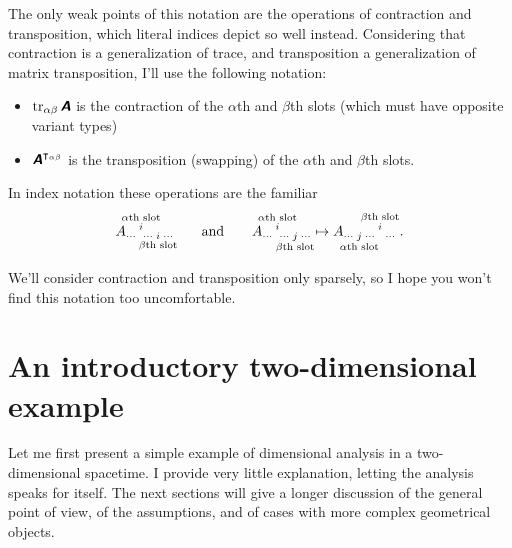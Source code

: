 \documentclass[\ifafour a4paper,12pt,\else a5paper,10pt,\fi%
onecolumn,oneside,article,%
british%
]{memoir}
\makeatletter
\theoremstyle{remark}
\theoremstyle{innote}
\newcommand*{\mathte}[1]{\textbf{\textit{\textsf{#1}}}}
\DeclareMathOperator{\tr}{tr}%
\renewcommand*{\|}[1][]{\nonscript\,#1\vert\nonscript\;\mathopen{}}
\newcommand*{\q}{}%
\DeclareRobustCommand*{\q}{%
  \mathbin{\mathpalette\bigcdot@{}}%
}
\newcommand*{\bigcdot@scalefactor}{0.75}
\newcommand*{\bigcdot@widthfactor}{1.5}
\newcommand*{\bigcdot@}[2]{%
  \sbox0{$#1\vcenter{}$}%
  \sbox2{$#1\cdot\m@th$}%
  \hbox to \bigcdot@widthfactor\wd2{%
    \hfil
    \raise\ht0\hbox{%
      \scalebox{\bigcdot@scalefactor}{%
        \lower\ht0\hbox{$#1\bullet\m@th$}%
      }%
    }%
    \hfil
  }%
}
\newcommand*{\yA}{\mathte{A}}
\renewcommand*{\i}{\indices}
\makeatother
\begin{document}
The only weak points of this notation are the operations of contraction and
transposition, which literal indices depict so well instead. Considering
that contraction is a generalization of trace, and transposition a
generalization of matrix transposition, I'll use the following notation:
\begin{itemize}[wide]%
\item $\tr_{\alpha\beta}\yA$ is the contraction of the
  $\alpha$th and $\beta$th slots (which must have opposite variant types)
\item $\yA^{\intercal_{\alpha\beta}}$ is the transposition
  (swapping) of the $\alpha$th and $\beta$th slots.
\end{itemize}
In index notation these operations are the familiar
\begin{equation*}
  A\i{_{\dotsm\;}^{%
      \overset{\mathclap{\scriptstyle\text{$\alpha$th slot}}}{i}
    }_{\dotsm\;%
      \underset{\mathclap{\scriptstyle\text{$\beta$th slot}}}{i}
      \;\dotsm}}
  \qquad\text{and}\qquad
  A\i{_{\dotsm\;}^{%
      \overset{\mathclap{\scriptstyle\text{$\alpha$th slot}}}{i}
    }_{\dotsm\;%
      \underset{\mathclap{\scriptstyle\text{$\beta$th slot}}}{j}
      \;\dotsm}}
  \mapsto
  A\i{_{\dotsm\;%
      \underset{\mathclap{\scriptstyle\text{$\alpha$th slot}}}{j}
      \;\dotsm\;}^{%
      \overset{\mathclap{\scriptstyle\text{$\beta$th slot}}}{i}
    }_{\;\dotsm}} \;.
\end{equation*}

We'll consider contraction and transposition only sparsely, so I hope you
won't find this notation too uncomfortable.





\section{An introductory two-dimensional example}
\label{sec:2d_example}

Let me first present a simple example of dimensional analysis in a
two-dimensional spacetime. I provide very little explanation, letting the
analysis speaks for itself. The next sections will give a longer discussion
of the general point of view, of the assumptions, and of cases with more
complex geometrical objects.
\end{document}
